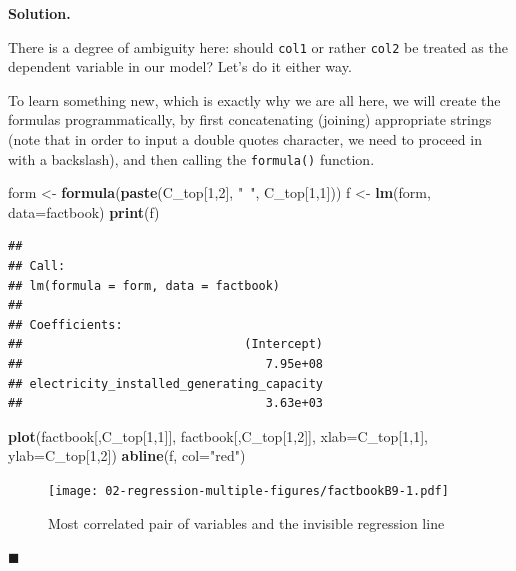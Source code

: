 \documentclass[10pt,b5paper,krantz1]{krantz}
\newenvironment{Shaded}{\begin{snugshade}}{\end{snugshade}}
\newcommand{\DataTypeTok}[1]{\textcolor[rgb]{0.27,0.27,0.27}{#1}}
\newcommand{\DecValTok}[1]{\textcolor[rgb]{0.06,0.06,0.06}{#1}}
\newcommand{\KeywordTok}[1]{\textcolor[rgb]{0.27,0.27,0.27}{\textbf{#1}}}
\newcommand{\NormalTok}[1]{#1}
\newcommand{\StringTok}[1]{\textcolor[rgb]{0.5,0.5,0.5}{#1}}
\newenvironment{solution}{%
\bigskip\noindent\textbf{Solution. }%
\it\ignorespaces%
\ignorespaces%
}{\ignorespaces%
\hfill$\blacksquare$%
}
\begin{document}
\begin{solution}

There is a degree of ambiguity here: should \texttt{col1} or rather \texttt{col2}
be treated as the dependent variable in our model?
Let's do it either way.

To learn something new, which is exactly why we are all here,
we will create the formulas programmatically, by first
concatenating (joining) appropriate strings
(note that in order to input a double quotes character,
we need to proceed in with a backslash), and then
calling the \texttt{formula()} function.

\begin{Shaded}
\begin{Highlighting}[]
\NormalTok{form <-}\StringTok{ }\KeywordTok{formula}\NormalTok{(}\KeywordTok{paste}\NormalTok{(C_top[}\DecValTok{1}\NormalTok{,}\DecValTok{2}\NormalTok{], }\StringTok{"~"}\NormalTok{, C_top[}\DecValTok{1}\NormalTok{,}\DecValTok{1}\NormalTok{]))}
\NormalTok{f <-}\StringTok{ }\KeywordTok{lm}\NormalTok{(form, }\DataTypeTok{data=}\NormalTok{factbook)}
\KeywordTok{print}\NormalTok{(f)}
\end{Highlighting}
\end{Shaded}

\begin{verbatim}
## 
## Call:
## lm(formula = form, data = factbook)
## 
## Coefficients:
##                               (Intercept)  
##                                  7.95e+08  
## electricity_installed_generating_capacity  
##                                  3.63e+03
\end{verbatim}

\begin{Shaded}
\begin{Highlighting}[]
\KeywordTok{plot}\NormalTok{(factbook[,C_top[}\DecValTok{1}\NormalTok{,}\DecValTok{1}\NormalTok{]], factbook[,C_top[}\DecValTok{1}\NormalTok{,}\DecValTok{2}\NormalTok{]],}
    \DataTypeTok{xlab=}\NormalTok{C_top[}\DecValTok{1}\NormalTok{,}\DecValTok{1}\NormalTok{], }\DataTypeTok{ylab=}\NormalTok{C_top[}\DecValTok{1}\NormalTok{,}\DecValTok{2}\NormalTok{])}
\KeywordTok{abline}\NormalTok{(f, }\DataTypeTok{col=}\StringTok{"red"}\NormalTok{)}
\end{Highlighting}
\end{Shaded}

\begin{figure}
\hypertarget{fig:factbookB9}{%
\centering
\texttt{[image: 02-regression-multiple-figures/factbookB9-1.pdf]}
\caption{Most correlated pair of variables and the invisible regression line}\label{fig:factbookB9}
}
\end{figure}


\end{solution}
\end{document}
